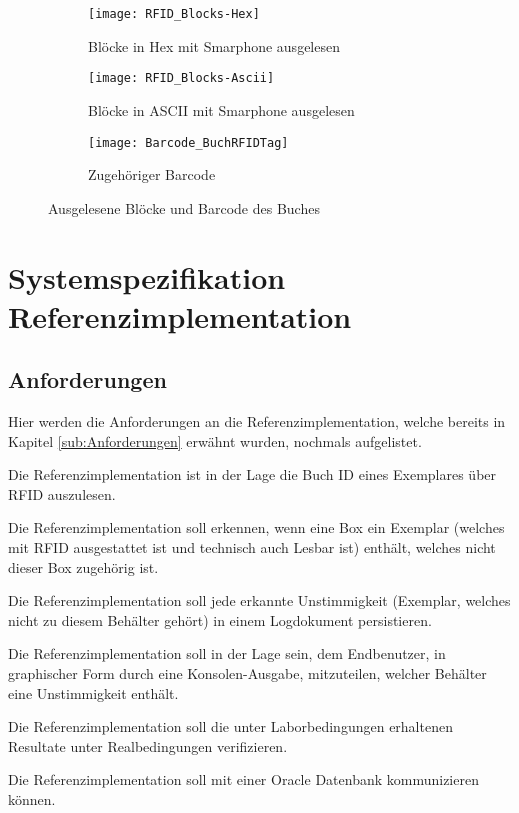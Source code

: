 \begin{figure}[p]
	\centering
	\begin{subfigure}[t]{.45\textwidth}
		\centering
		\texttt{[image: RFID\_Blocks-Hex]}
		\caption{Blöcke in Hex mit Smarphone ausgelesen}
	\end{subfigure}
	\begin{subfigure}[t]{.45\textwidth}
		\centering
		\texttt{[image: RFID\_Blocks-Ascii]}
		\caption{Blöcke in ASCII mit Smarphone ausgelesen}
	\end{subfigure}
	\begin{subfigure}[b]{.3\textwidth}
		\centering
		\texttt{[image: Barcode\_BuchRFIDTag]}
		\caption{Zugehöriger Barcode}
	\end{subfigure}
	\caption{Ausgelesene Blöcke und Barcode des Buches}
	\label{fig:AusgeleseneBloeckeUndBarcode}
\end{figure}


\clearpage
\section{Systemspezifikation Referenzimplementation}
\label{sec:SysSpec}

\subsection{Anforderungen}
\label{sub:ReferenzimplementationAnforderungen}
Hier werden die Anforderungen an die Referenzimplementation, welche bereits in Kapitel \ref{sub:Anforderungen} erwähnt wurden, nochmals aufgelistet.
\begin{legal}
	\item Die Referenzimplementation ist in der Lage die Buch ID eines Exemplares über RFID auszulesen.
	\item Die Referenzimplementation soll erkennen, wenn eine Box ein Exemplar (welches mit RFID ausgestattet ist und technisch auch Lesbar ist) enthält, welches nicht dieser Box zugehörig ist.
	\item Die Referenzimplementation soll jede erkannte Unstimmigkeit (Exemplar, welches nicht zu diesem Behälter gehört) in einem Logdokument persistieren.
	\item Die Referenzimplementation soll in der Lage sein, dem Endbenutzer, in graphischer Form durch eine Konsolen-Ausgabe, mitzuteilen, welcher Behälter eine Unstimmigkeit enthält.
	\item Die Referenzimplementation soll die unter Laborbedingungen erhaltenen Resultate unter Realbedingungen verifizieren.
	\item Die Referenzimplementation soll mit einer Oracle Datenbank kommunizieren können.
\end{legal}

